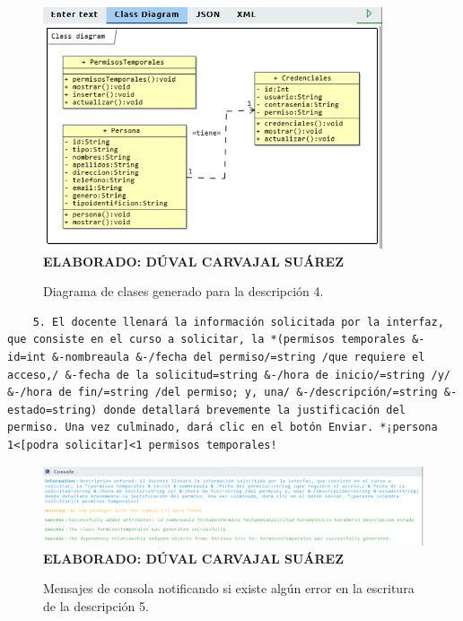  \begin{figure}[H]
 	\caption{Diagrama de clases generado para la descripción 4.}
 	\includegraphics[width=10cm]{img/dc-eva-004.png}
 	\label{fig:dc_eva_004}
 	\textbf{\\ ELABORADO: DÚVAL CARVAJAL SUÁREZ}
 \end{figure}
 
 \begin{lstlisting}
 	5. El docente llenará la información solicitada por la interfaz, que consiste en el curso a solicitar, la *(permisos temporales &-id=int &-nombreaula &-/fecha del permiso/=string /que requiere el acceso,/ &-fecha de la solicitud=string &-/hora de inicio/=string /y/ &-/hora de fin/=string /del permiso; y, una/ &-/descripción/=string &-estado=string) donde detallará brevemente la justificación del permiso. Una vez culminado, dará clic en el botón Enviar. *¡persona 1<[podra solicitar]<1 permisos temporales! \end{lstlisting}
 
    \begin{figure}[h!]
 	\caption{Mensajes de consola notificando si existe algún error en la escritura de la descripción 5.}
 	\includegraphics[width=15cm]{img/not-eva-005.png}
 	\label{fig:not_eva_005}
 	\textbf{\\ ELABORADO: DÚVAL CARVAJAL SUÁREZ}
 \end{figure}
 
